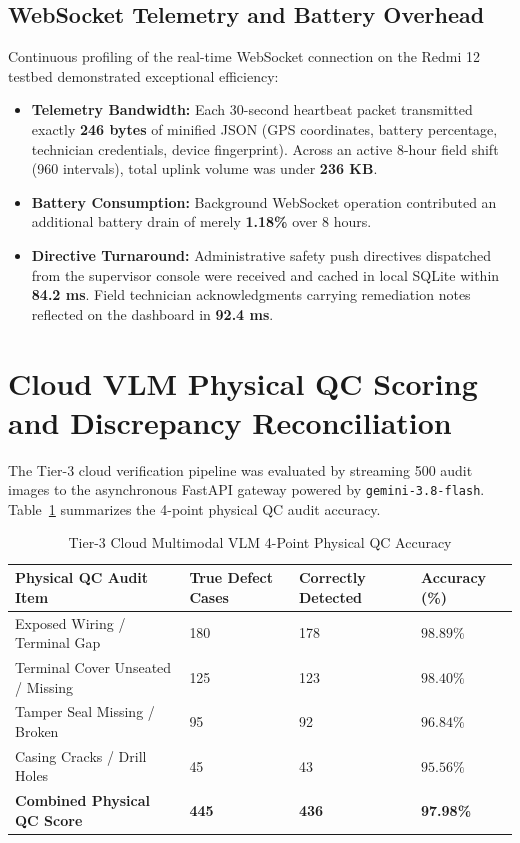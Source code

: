 \documentclass[12pt,a4paper,oneside]{report}
\begin{document}
\subsection{WebSocket Telemetry and Battery Overhead}
Continuous profiling of the real-time WebSocket connection on the Redmi 12 testbed demonstrated exceptional efficiency:
\begin{itemize}
    \item \textbf{Telemetry Bandwidth:} Each 30-second heartbeat packet transmitted exactly \textbf{246 bytes} of minified JSON (GPS coordinates, battery percentage, technician credentials, device fingerprint). Across an active 8-hour field shift (960 intervals), total uplink volume was under \textbf{236 KB}.
    \item \textbf{Battery Consumption:} Background WebSocket operation contributed an additional battery drain of merely \textbf{1.18\%} over 8 hours.
    \item \textbf{Directive Turnaround:} Administrative safety push directives dispatched from the supervisor console were received and cached in local SQLite within \textbf{84.2 ms}. Field technician acknowledgments carrying remediation notes reflected on the dashboard in \textbf{92.4 ms}.
\end{itemize}

\section{Cloud VLM Physical QC Scoring and Discrepancy Reconciliation}
The Tier-3 cloud verification pipeline was evaluated by streaming 500 audit images to the asynchronous FastAPI gateway powered by \texttt{gemini-3.8-flash}. Table~\ref{tab:vlm_results} summarizes the 4-point physical QC audit accuracy.

\begin{table}[htbp]
\caption{Tier-3 Cloud Multimodal VLM 4-Point Physical QC Accuracy}
\label{tab:vlm_results}
\centering
\begin{tabularx}{\textwidth}{lXXX}
\toprule
\textbf{Physical QC Audit Item} & \textbf{True Defect Cases} & \textbf{Correctly Detected} & \textbf{Accuracy (\%)} \\
\midrule
Exposed Wiring / Terminal Gap & 180 & 178 & $98.89\%$ \\
Terminal Cover Unseated / Missing & 125 & 123 & $98.40\%$ \\
Tamper Seal Missing / Broken & 95 & 92 & $96.84\%$ \\
Casing Cracks / Drill Holes & 45 & 43 & $95.56\%$ \\
\midrule
\textbf{Combined Physical QC Score} & \textbf{445} & \textbf{436} & \textbf{97.98\%} \\
\bottomrule
\end{tabularx}
\end{table}
\end{document}
